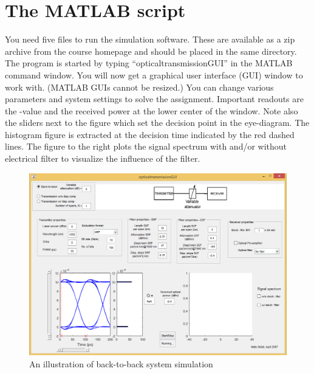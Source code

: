 \documentclass[10pt,letterpaper]{article}
\begin{document}
\section{The MATLAB script}
You need five files to run the simulation software. These are available as a zip archive from the course homepage and should be placed in the same directory. The program is started by typing ``opticaltransmissionGUI'' in the MATLAB command window. You will now get a graphical user interface (GUI) window to work with. (MATLAB GUIs cannot be resized.) You can change various parameters and system settings to solve the assignment. Important readouts are the -value and the received power at the lower center of the window. Note also the sliders next to the figure which set the decision point in the eye-diagram. The histogram figure is extracted at the decision time indicated by the red dashed lines. The figure to the right plots the signal spectrum with and/or without electrical filter to visualize the influence of the filter.
\begin{figure}[h]
\centering
\includegraphics[width=160mm]{back2back_example}
\caption{An illustration of back-to-back system simulation}
\end{figure}
\end{document}
